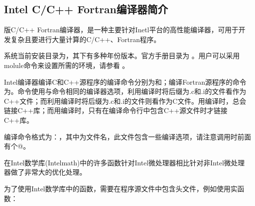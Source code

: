 \documentclass[a4paper,12pt,english]{sphinxmanual}
\begin{document}
\subsection{Intel C/C++ Fortran编译器简介}
\label{\detokenize{compiler/intel:id1}}
\sphinxAtStartPar
{}版C/C++ Fortran编译器，是一种主要针对Inetl平台的高性能编译器，可用于开发复杂且要进行大量计算的C/C++、Fortran程序。

\sphinxAtStartPar
系统当前安装目录为，其下有多种年份版本。官方手册目录为  。用户可以采用molule命令来设置所需的环境，请参看 。

\sphinxAtStartPar
Intel编译器编译C和C++源程序的编译命令分别为和；编译Fortran源程序的命令为。命令使用与命令相同的编译器选项，利用编译时将后缀为.c和.i的文件看作为C++文件；而利用编译时将后缀为.c和.i的文件则看作为C文件。用编译时，总会链接C++库；而用编译时，只有在编译命令行中包含C++源文件时才链接C++库。

\sphinxAtStartPar
编译命令格式为：，其中为文件名，此文件包含一些编译选项，请注意调用时前面有个@。

\sphinxAtStartPar
在Intel数学库(Intelmath)中的许多函数针对Intel微处理器相比针对非Intel微处理器做了非常大的优化处理。

\sphinxAtStartPar
为了使用Intel数学库中的函数，需要在程序源文件中包含头文件，例如使用实函数：
\end{document}
